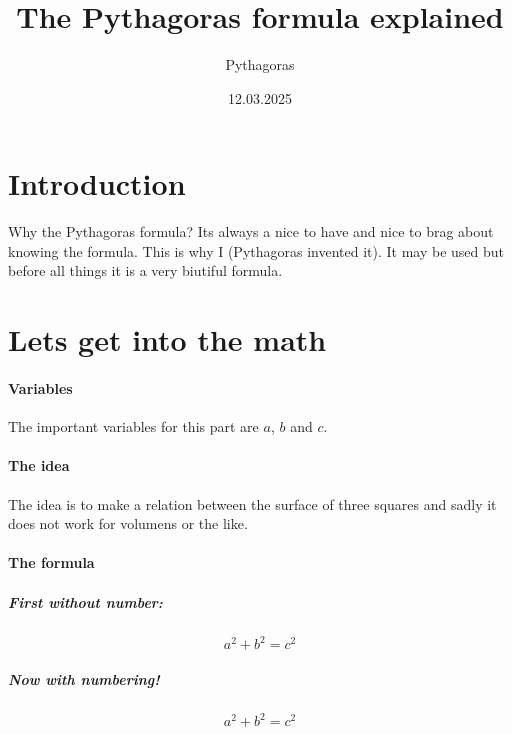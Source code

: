 \documentclass{article}
\title{The Pythagoras formula explained}
\author{Pythagoras}
\date{12.03.2025}
\begin{document}
\maketitle
\newpage
{}

\section{Introduction}
Why the Pythagoras formula? Its always a nice to have and nice to brag about knowing the formula. This is why I (Pythagoras invented it). It may be used but before all things it is a very biutiful formula. 

\section{Lets get into the math}
\paragraph{Variables} 
The important variables for this part are \(a\), \(b\) and \(c\).
\paragraph{The idea}
The idea is to make a relation between the surface of three squares and sadly it does not work for volumens or the like.
\paragraph{ The formula}
\subparagraph{First without number:}
\begin{equation*}
  a^2 + b^2 = c^2 
\end{equation*}
\subparagraph{Now with numbering!}
\begin{equation}
  a^2 + b^2 = c^2 
\end{equation}
\end{document}
